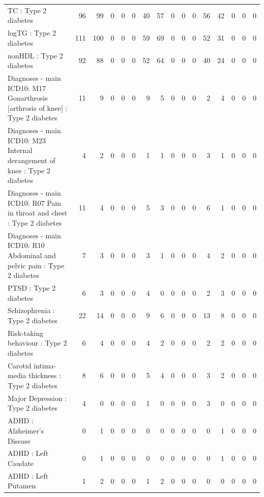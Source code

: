 \begin{table}[ht]
\begin{tabular}{lrrrrrrrrrrrrrrr}
  TC : Type 2 diabetes &  96 &  99 &   0 &   0 &   0 &  40 &  57 &   0 &   0 &   0 &  56 &  42 &   0 &   0 &   0 \\ 
  logTG : Type 2 diabetes & 111 & 100 &   0 &   0 &   0 &  59 &  69 &   0 &   0 &   0 &  52 &  31 &   0 &   0 &   0 \\ 
  nonHDL : Type 2 diabetes &  92 &  88 &   0 &   0 &   0 &  52 &  64 &   0 &   0 &   0 &  40 &  24 &   0 &   0 &   0 \\ 
  Diagnoses - main ICD10: M17 Gonarthrosis [arthrosis of knee] : Type 2 diabetes &  11 &   9 &   0 &   0 &   0 &   9 &   5 &   0 &   0 &   0 &   2 &   4 &   0 &   0 &   0 \\ 
  Diagnoses - main ICD10: M23 Internal derangement of knee : Type 2 diabetes &   4 &   2 &   0 &   0 &   0 &   1 &   1 &   0 &   0 &   0 &   3 &   1 &   0 &   0 &   0 \\ 
  Diagnoses - main ICD10: R07 Pain in throat and chest : Type 2 diabetes &  11 &   4 &   0 &   0 &   0 &   5 &   3 &   0 &   0 &   0 &   6 &   1 &   0 &   0 &   0 \\ 
  Diagnoses - main ICD10: R10 Abdominal and pelvic pain : Type 2 diabetes &   7 &   3 &   0 &   0 &   0 &   3 &   1 &   0 &   0 &   0 &   4 &   2 &   0 &   0 &   0 \\ 
  PTSD : Type 2 diabetes &   6 &   3 &   0 &   0 &   0 &   4 &   0 &   0 &   0 &   0 &   2 &   3 &   0 &   0 &   0 \\ 
  Schizophrenia : Type 2 diabetes &  22 &  14 &   0 &   0 &   0 &   9 &   6 &   0 &   0 &   0 &  13 &   8 &   0 &   0 &   0 \\ 
  Risk-taking behaviour : Type 2 diabetes &   6 &   4 &   0 &   0 &   0 &   4 &   2 &   0 &   0 &   0 &   2 &   2 &   0 &   0 &   0 \\ 
  Carotid intima-media thickness : Type 2 diabetes &   8 &   6 &   0 &   0 &   0 &   5 &   4 &   0 &   0 &   0 &   3 &   2 &   0 &   0 &   0 \\ 
  Major Depression : Type 2 diabetes &   4 &   0 &   0 &   0 &   0 &   1 &   0 &   0 &   0 &   0 &   3 &   0 &   0 &   0 &   0 \\ 
  ADHD : Alzheimer's Disease &   0 &   1 &   0 &   0 &   0 &   0 &   0 &   0 &   0 &   0 &   0 &   1 &   0 &   0 &   0 \\ 
  ADHD : Left Caudate &   0 &   1 &   0 &   0 &   0 &   0 &   0 &   0 &   0 &   0 &   0 &   1 &   0 &   0 &   0 \\ 
  ADHD : Left Putamen &   1 &   2 &   0 &   0 &   0 &   1 &   2 &   0 &   0 &   0 &   0 &   0 &   0 &   0 &   0 \\ 

\end{tabular}
\end{table}
